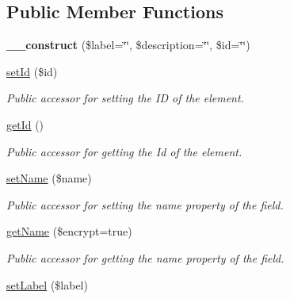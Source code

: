 \subsection*{Public Member Functions}
\begin{DoxyCompactItemize}
\item 
\hypertarget{class_element_acdaa3f222f67ecd7dd1da264ab2018b0}{
{\bfseries \_\-\_\-construct} (\$label=\char`\"{}\char`\"{}, \$description=\char`\"{}\char`\"{}, \$id=\char`\"{}\char`\"{})}
\label{class_element_acdaa3f222f67ecd7dd1da264ab2018b0}

\item 
\hyperlink{class_element_a01d8f5e07035ebfe29d4e9306a844cfa}{setId} (\$id)
\begin{DoxyCompactList}\small\item\em Public accessor for setting the ID of the element. \item\end{DoxyCompactList}\item 
\hypertarget{class_element_a08c051073dc9f00cec376e15e543addc}{
\hyperlink{class_element_a08c051073dc9f00cec376e15e543addc}{getId} ()}
\label{class_element_a08c051073dc9f00cec376e15e543addc}

\begin{DoxyCompactList}\small\item\em Public accessor for getting the Id of the element. \item\end{DoxyCompactList}\item 
\hyperlink{class_element_aa3025edf6bfddbe2f3095ce0c448a538}{setName} (\$name)
\begin{DoxyCompactList}\small\item\em Public accessor for setting the name property of the field. \item\end{DoxyCompactList}\item 
\hyperlink{class_element_a718d240d4dbec56c65f5d7271721951a}{getName} (\$encrypt=true)
\begin{DoxyCompactList}\small\item\em Public accessor for getting the name property of the field. \item\end{DoxyCompactList}\item 
\hypertarget{class_element_a2eaac0b9bab27f41dc7e6f296b3ba910}{
\hyperlink{class_element_a2eaac0b9bab27f41dc7e6f296b3ba910}{setLabel} (\$label)}
\label{class_element_a2eaac0b9bab27f41dc7e6f296b3ba910}


\end{DoxyCompactItemize}
